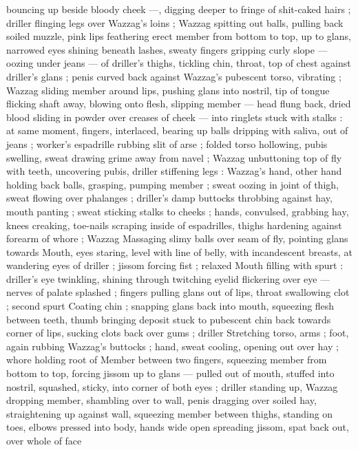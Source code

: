 bouncing up beside bloody cheek ---, digging deeper to fringe of
shit-caked hairs ; driller flinging legs over Wazzag's loins ; Wazzag
spitting out balls, pulling back soiled muzzle, pink lips feathering
erect member from bottom to top, up to glans, narrowed eyes shining
beneath lashes, sweaty fingers gripping curly slope --- oozing under
jeans --- of driller's thighs, tickling chin, throat, top of chest against
driller's glans ; penis curved back against Wazzag's pubescent torso,
vibrating ; Wazzag sliding member around lips, pushing glans into
nostril, tip of tongue flicking shaft away, blowing onto flesh, slipping
member --- head flung back, dried blood sliding in powder over
creases of cheek --- into ringlets stuck with stalks : at same moment,
fingers, interlaced, bearing up balls dripping with saliva, out of jeans
; worker's espadrille rubbing slit of arse ; folded torso hollowing,
pubis swelling, sweat drawing grime away from navel ; Wazzag
unbuttoning top of fly with teeth, uncovering pubis, driller stiffening
legs : Wazzag's hand, other hand holding back balls, grasping,
pumping member ; sweat oozing in joint of thigh, sweat flowing over
phalanges ; driller's damp buttocks throbbing against hay, mouth
panting ; sweat sticking stalks to cheeks ; hands, convulsed,
grabbing hay, knees creaking, toe-nails scraping inside of
espadrilles, thighs hardening against forearm of whore ; Wazzag
Massaging slimy balls over seam of fly, pointing glans towards
Mouth, eyes staring, level with line of belly, with incandescent
breasts, at wandering eyes of driller ; jissom forcing fist ; relaxed
Mouth filling with spurt : driller's eye twinkling, shining through
twitching eyelid flickering over eye --- nerves of palate splashed ;
fingers pulling glans out of lips, throat swallowing clot ; second spurt
Coating chin ; snapping glans back into mouth, squeezing flesh
between teeth, thumb bringing deposit stuck to pubescent chin back
towards corner of lips, sucking clots back over gums ; driller
Stretching torso, arms ; foot, again rubbing Wazzag's buttocks ;
hand, sweat cooling, opening out over hay ; whore holding root of
Member between two fingers, squeezing member from bottom to top,
forcing jissom up to glans --- pulled out of mouth, stuffed into
nostril, squashed, sticky, into corner of both eyes ; driller standing
up, Wazzag dropping member, shambling over to wall, penis dragging
over soiled hay, straightening up against wall, squeezing member
between thighs, standing on toes, elbows pressed into body, hands
wide open spreading jissom, spat back out, over whole of face
